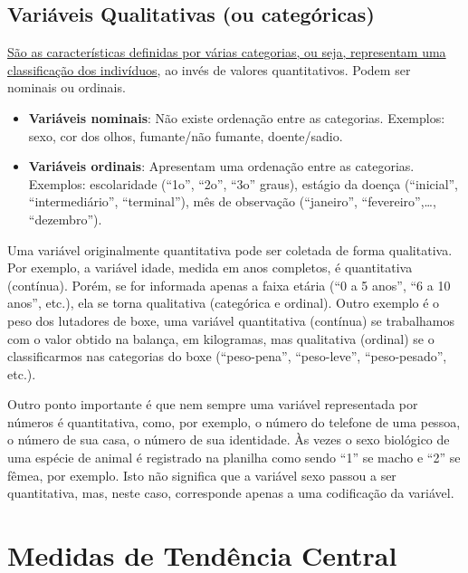 \documentclass[
]{book}
\providecommand{\tightlist}{%
  \setlength{\itemsep}{0pt}\setlength{\parskip}{0pt}}
\begin{document}
\hypertarget{variuxe1veis-qualitativas-ou-categuxf3ricas}{%
\subsection{Variáveis Qualitativas (ou categóricas)}\label{variuxe1veis-qualitativas-ou-categuxf3ricas}}

\uline{São as características definidas por várias categorias, ou seja, representam uma classificação dos indivíduos}, ao invés de valores quantitativos. Podem ser nominais ou ordinais.

\begin{itemize}
\tightlist
\item
  \textbf{Variáveis nominais}: Não existe ordenação entre as categorias. Exemplos: sexo, cor dos olhos, fumante/não fumante, doente/sadio.
\item
  \textbf{Variáveis ordinais}: Apresentam uma ordenação entre as categorias. Exemplos: escolaridade (``1o'', ``2o'', ``3o'' graus), estágio da doença (``inicial'', ``intermediário'', ``terminal''), mês de observação (``janeiro'', ``fevereiro'',\ldots, ``dezembro'').
\end{itemize}

Uma variável originalmente quantitativa pode ser coletada de forma qualitativa. Por exemplo, a variável idade, medida em anos completos, é quantitativa (contínua). Porém, se for informada apenas a faixa etária (``0 a 5 anos'', ``6 a 10 anos'', etc.), ela se torna qualitativa (categórica e ordinal). Outro exemplo é o peso dos lutadores de boxe, uma variável quantitativa (contínua) se trabalhamos com o valor obtido na balança, em kilogramas, mas qualitativa (ordinal) se o classificarmos nas categorias do boxe (``peso-pena'', ``peso-leve'', ``peso-pesado'', etc.).

Outro ponto importante é que nem sempre uma variável representada por números é quantitativa, como, por exemplo, o número do telefone de uma pessoa, o número de sua casa, o número de sua identidade. Às vezes o sexo biológico de uma espécie de animal é registrado na planilha como sendo ``1'' se macho e ``2'' se fêmea, por exemplo. Isto não significa que a variável sexo passou a ser quantitativa, mas, neste caso, corresponde apenas a uma codificação da variável.

\hypertarget{medidas-de-tenduxeancia-central}{%
\section{Medidas de Tendência Central}\label{medidas-de-tenduxeancia-central}}
\end{document}
